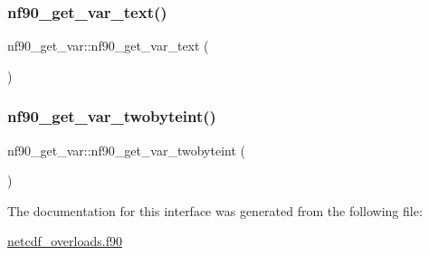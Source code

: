 \subsubsection{\texorpdfstring{nf90\+\_\+get\+\_\+var\+\_\+text()}{nf90\_get\_var\_text()}}
{\footnotesize\ttfamily nf90\+\_\+get\+\_\+var\+::nf90\+\_\+get\+\_\+var\+\_\+text (\begin{DoxyParamCaption}{ }\end{DoxyParamCaption})}

\mbox{\label{interfacenf90__get__var_a9b5a0918dfcd8853031b3c952c161e9c}} 
\subsubsection{\texorpdfstring{nf90\+\_\+get\+\_\+var\+\_\+twobyteint()}{nf90\_get\_var\_twobyteint()}}
{\footnotesize\ttfamily nf90\+\_\+get\+\_\+var\+::nf90\+\_\+get\+\_\+var\+\_\+twobyteint (\begin{DoxyParamCaption}{ }\end{DoxyParamCaption})}



The documentation for this interface was generated from the following file\+:\begin{DoxyCompactItemize}
\item 
\hyperlink{netcdf__overloads_8f90}{netcdf\+\_\+overloads.\+f90}\end{DoxyCompactItemize}
